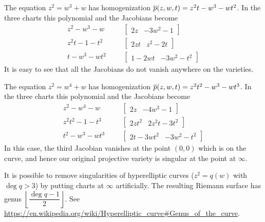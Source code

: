 \documentclass{article}
\begin{document}
\begin{ex}
  The equation $z^2 = w^3 + w$ has homogenization $\overline{p}(z,w,t) = z^2 t - w^3 - w t^2$.
  In the three charts this polynomial and the Jacobians become
  \begin{align*}
    z^2  - w^3 - w  &&& \begin{bmatrix} 2z & -3w^2 - 1 \end{bmatrix}\\
    z^2 t - 1 - t^2 &&& \begin{bmatrix} 2zt & z^2 - 2t \end{bmatrix}\\
    t - w^3 - w t^2 &&& \begin{bmatrix} 1 - 2wt & -3w^2 - t^2 \end{bmatrix}
  \end{align*}
  It is easy to see that all the Jacobians do not vanish anywhere on the varieties.
\end{ex}

\begin{ex}
  The equation $z^2 = w^4 + w$ has homogenization $\overline{p}(z,w,t) = z^2 t^2 - w^3 - w t^3$.
  In the three charts this polynomial and the Jacobians become
  \begin{align*}
    z^2  - w^4 - w  &&& \begin{bmatrix} 2z & -4w^3 - 1 \end{bmatrix}\\
    z^2 t^2 - 1 - t^3 &&& \begin{bmatrix} 2zt^2 & 2z^2t - 3t^2 \end{bmatrix}\\
    t^2 - w^3 - w t^3 &&& \begin{bmatrix} 2t - 3wt^2 & -3w^2 - t^2 \end{bmatrix}
  \end{align*}
  In this case, the third Jacobian vanishes at the point $(0,0)$ which is on the curve, and hence our original projective variety is singular at the point at $\infty$.
\end{ex}

It is possible to remove singularities of hyperelliptic curves ($z^2 = q(w)$ with $\deg q > 3$) by putting charts at $\infty$ artificially.
The resulting Riemann surface has genus $\left \lfloor{\dfrac{\deg q - 1}{2}}\right \rfloor $. See \\ \url{https://en.wikipedia.org/wiki/Hyperelliptic_curve#Genus_of_the_curve}.
\end{document}
